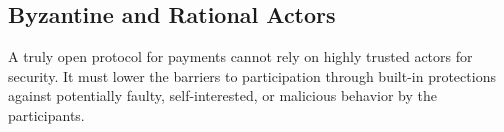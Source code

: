 \documentclass[letterpaper,twocolumn,10pt]{article}
\begin{document}





\subsection{Byzantine and Rational Actors}

A truly open protocol for payments cannot rely on highly trusted actors for security. It must lower the barriers to participation through built-in protections against potentially faulty, self-interested, or malicious behavior by the participants.

\end{document}
